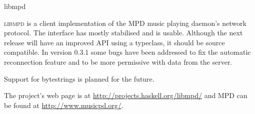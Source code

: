 \begin{hcarentry}{libmpd}
\makeheader

\textsc{libmpd} is a client implementation of the MPD music playing
daemon's network protocol. The interface has mostly stabilised and is
usable.  Although the next release will have an improved API using a
typeclass, it should be source compatible.  In version 0.3.1 some bugs
have been addressed to fix the automatic reconnection feature and to
be more permissive with data from the server.

Support for bytestrings is planned for the future.

\FurtherReading
The project's web page is at \url{http://projects.haskell.org/libmpd/}
and MPD can be found at \url{http://www.musicpd.org/}.
\end{hcarentry}
